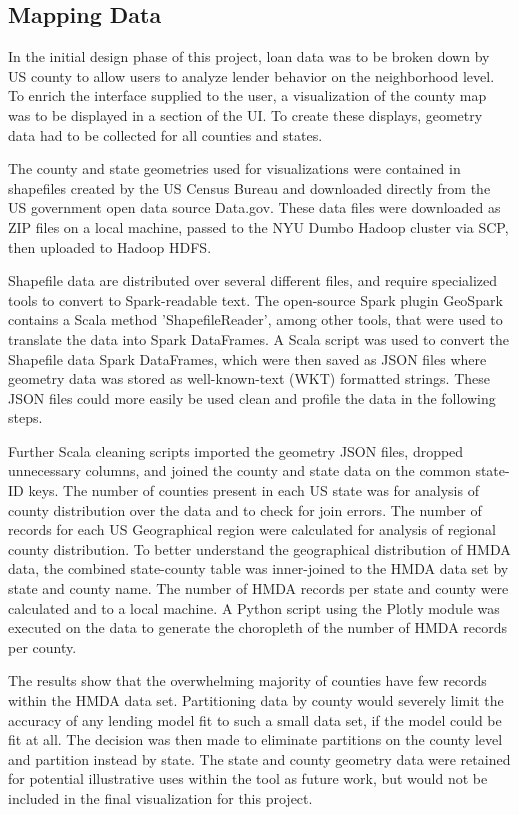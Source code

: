 \documentclass[conference,compsoc]{IEEEtran}
\begin{document}
\subsection{Mapping Data}

In the initial design phase of this project, loan data was to be broken down by US county to allow users to analyze lender behavior on the neighborhood level. To enrich the interface supplied to the user, a visualization of the county map was to be displayed in a section of the UI. To create these displays, geometry data had to be collected for all counties and states. 

The county and state geometries used for visualizations were contained in shapefiles created by the US Census Bureau and downloaded directly from the US government open data source Data.gov. These data files were downloaded as ZIP files on a local machine, passed to the NYU Dumbo Hadoop cluster via SCP, then uploaded to Hadoop HDFS. 

Shapefile data are distributed over several different files, and require specialized tools to convert to Spark-readable text. The open-source Spark plugin GeoSpark contains a Scala method 'ShapefileReader', among other tools, that were used to translate the data into Spark DataFrames. A Scala script was used to convert the Shapefile data Spark DataFrames, which were then saved as JSON files where geometry data was stored as well-known-text (WKT) formatted strings. These JSON files could more easily be used clean and profile the data in the following steps.

Further Scala cleaning scripts imported the geometry JSON files, dropped unnecessary columns, and joined the county and state data on the common state-ID keys. The number of counties present in each US state was for analysis of county distribution over the data and to check for join errors. The number of records for each US Geographical region were calculated for analysis of regional county distribution.
To better understand the geographical distribution of HMDA data, the combined state-county table was inner-joined to the HMDA data set by state and county name. The number of HMDA records per state and county were calculated and to a local machine. A Python script using the Plotly module was executed on the data to generate the choropleth of the number of HMDA records per county. 

The results show that the overwhelming majority of counties have few records within the HMDA data set. Partitioning data by county would severely limit the accuracy of any lending model fit to such a small data set, if the model could be fit at all. The decision was then made to eliminate partitions on the county level and partition instead by state. The state and county geometry data were retained for potential illustrative uses within the tool as future work, but would not be included in the final visualization for this project. 
\end{document}
